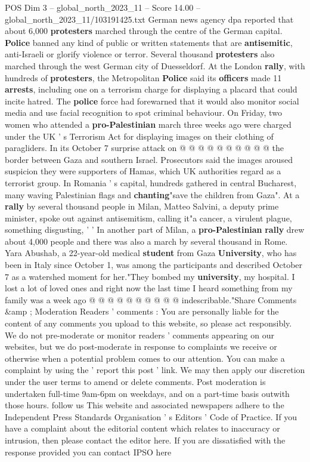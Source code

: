 \begin{textsample}{POS Dim 3 – global\_north\_2023\_11 – Score 14.00 – global\_north\_2023\_11/103191425.txt}
German news agency dpa reported that about 6,000 \textbf{protesters} marched through the centre of the German capital. \textbf{Police} banned any kind of public or written statements that are \textbf{antisemitic}, anti-Israeli or glorify violence or terror.
Several thousand \textbf{protesters} also marched through the west German city of Duesseldorf.
At the London \textbf{rally}, with hundreds of \textbf{protesters}, the Metropolitan \textbf{Police} said its \textbf{officers} made 11 \textbf{arrests}, including one on a terrorism charge for displaying a placard that could incite hatred.
The \textbf{police} force had forewarned that it would also monitor social media and use facial recognition to spot criminal behaviour.
On Friday, two women who attended a \textbf{pro-Palestinian} march three weeks ago were charged under the UK ' s Terrorism Act for displaying images on their clothing of paragliders.
In its October 7 surprise attack on @ @ @ @ @ @ @ @ @ @ the border between Gaza and southern Israel.
Prosecutors said the images aroused suspicion they were supporters of Hamas, which UK authorities regard as a terrorist group.
In Romania ' s capital, hundreds gathered in central Bucharest, many waving Palestinian flags and \textbf{chanting}"save the children from Gaza".
At a \textbf{rally} by several thousand people in Milan, Matteo Salvini, a deputy prime minister, spoke out against antisemitism, calling it"a cancer, a virulent plague, something disgusting, ' ' In another part of Milan, a \textbf{pro-Palestinian} \textbf{rally} drew about 4,000 people and there was also a march by several thousand in Rome.
Yara Abushab, a 22-year-old medical \textbf{student} from Gaza \textbf{University}, who has been in Italy since October 1, was among the participants and described October 7 as a watershed moment for her."They bombed my \textbf{university}, my hospital.
I lost a lot of loved ones and right now the last time I heard something from my family was a week ago @ @ @ @ @ @ @ @ @ @ indescribable."Share Comments \&amp ; Moderation Readers ' comments : You are personally liable for the content of any comments you upload to this website, so please act responsibly.
We do not pre-moderate or monitor readers ' comments appearing on our websites, but we do post-moderate in response to complaints we receive or otherwise when a potential problem comes to our attention.
You can make a complaint by using the ' report this post ' link.
We may then apply our discretion under the user terms to amend or delete comments.
Post moderation is undertaken full-time 9am-6pm on weekdays, and on a part-time basis outwith those hours. follow us This website and associated newspapers adhere to the Independent Press Standards Organisation ' s Editors ' Code of Practice.
If you have a complaint about the editorial content which relates to inaccuracy or intrusion, then please contact the editor here.
If you are dissatisfied with the response provided you can contact IPSO here

\end{textsample}
